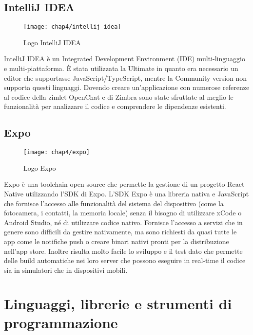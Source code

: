 \subsection{IntelliJ IDEA} \label{subsec:IntelliJ}
	\begin{figure}[H] 
		\centering
		\texttt{[image: chap4/intellij-idea]}
		\caption{Logo IntelliJ IDEA}
	\end{figure}
IntelliJ IDEA è un Integrated Development Environment (IDE) multi-linguaggio e 
multi-piattaforma. 
È stata utilizzata la  Ultimate in quanto era necessario un editor che 
supportasse  
JavaScript/TypeScript, mentre la Community version non supporta questi 
linguaggi. 
Dovendo creare un'applicazione con numerose referenze al codice della zimlet 
OpenChat e di Zimbra 
sono state sfruttate al meglio le funzionalità per analizzare il codice e 
comprendere le 
dipendenze esistenti.

\subsection{Expo} \label{subsec:expo}
	\begin{figure}[H] 
		\centering
		\texttt{[image: chap4/expo]}
		\caption{Logo Expo}
	\end{figure}
Expo è una toolchain open source che permette la gestione di un progetto React 
Native utilizzando l'SDK di Expo. L'SDK Expo è una libreria nativa e JavaScript 
che fornisce l'accesso alle funzionalità del sistema del dispositivo (come la 
fotocamera, i contatti, la memoria locale) senza il bisogno di utilizzare xCode 
o Android Studio, né di utilizzare codice nativo. Fornisce l'accesso a servizi 
che in genere sono difficili da gestire nativamente, ma sono richiesti da quasi 
tutte le app come le notifiche push o creare binari nativi pronti per la 
distribuzione nell'app store.
Inoltre risulta molto facile lo sviluppo e il test dato che permette delle 
build automatiche nei loro server che possono eseguire in real-time il codice 
sia in simulatori che in dispositivi mobili.


\section{Linguaggi, librerie e strumenti di programmazione}

